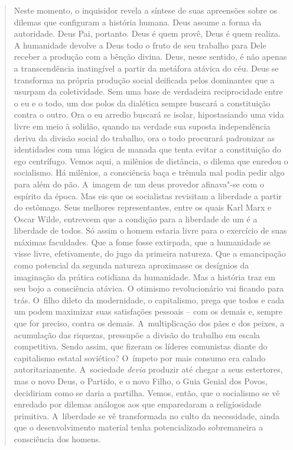 {\begin{quote}
Neste momento, o inquisidor revela a síntese de suas apreensões sobre os
dilemas que configuram a história humana. Deus assume a forma da
autoridade. Deus Pai, portanto. Deus é quem provê, Deus é quem realiza.
A humanidade devolve a Deus todo o fruto de seu trabalho para Dele
receber a produção com a bênção divina. Deus, nesse sentido, é não
apenas a transcendência inatingível a partir da metáfora atávica do céu.
Deus se transforma na própria produção social deificada pelos dominantes
que a usurpam da coletividade. Sem uma base de verdadeira reciprocidade
entre o eu e o todo, um dos polos da dialética sempre buscará a
constituição contra o outro. Ora o eu arredio buscará se isolar,
hipostasiando uma vida livre em meio à solidão, quando na verdade sua
suposta independência deriva da divisão social do trabalho, ora o todo
procurará padronizar as identidades com uma lógica de manada que tenta
evitar a constituição do ego centrífugo. Vemos aqui, a milênios de
distância, o dilema que enredou o socialismo. Há milênios, a consciência
baça e trêmula mal podia pedir algo para além do pão. A~imagem de um
deus provedor afinava"-se com o espírito da época. Mas eis que os
socialistas revisitam a liberdade a partir do estômago. Seus melhores
representantes, entre os quais Karl Marx e Oscar Wilde, entreveem que a
condição para a liberdade de um é a liberdade de todos. Só assim o homem
estaria livre para o exercício de suas máximas faculdades. Que a fome
fosse extirpada, que a humanidade se visse livre, efetivamente, do jugo
da primeira natureza. Que a emancipação como potencial da segunda
natureza aproximasse os desígnios da imaginação da prática cotidiana da
humanidade. Mas a história traz em seu bojo a consciência atávica. O
otimismo revolucionário vai ficando para trás. O~filho dileto da
modernidade, o capitalismo, prega que todos e cada um podem maximizar
suas satisfações pessoais -- com os demais e, sempre que for preciso,
contra os demais. A~multiplicação dos pães e dos peixes, a acumulação
das riquezas, pressupõe a divisão do trabalho em escala competitiva.
Sendo assim, que fizeram os líderes comunistas diante do capitalismo
estatal soviético? O~ímpeto por mais consumo era calado
autoritariamente. A~sociedade \emph{devia} produzir até chegar a seus
estertores, mas o novo Deus, o Partido, e o novo Filho, o Guia Genial
dos Povos, decidiriam como se daria a partilha. Vemos, então, que o
socialismo se vê enredado por dilemas análogos aos que emparedaram a
religiosidade primitiva. A~liberdade se vê transformada no culto da
necessidade, ainda que o desenvolvimento material tenha potencializado
sobremaneira a consciência dos homens.


\end{quote}}
